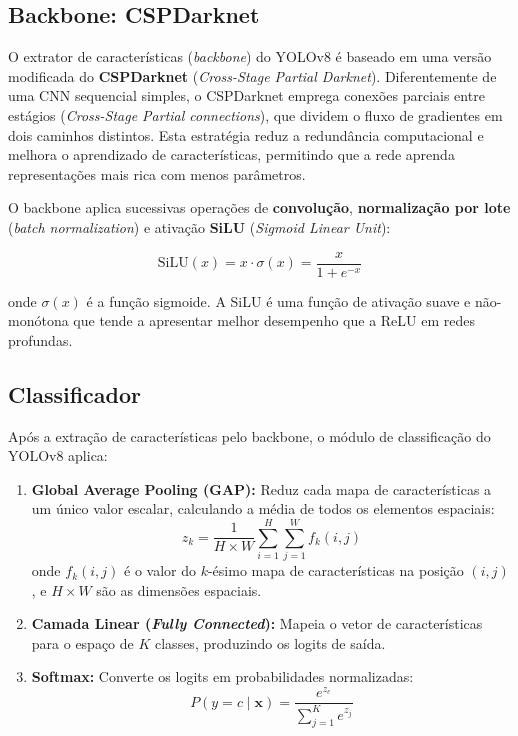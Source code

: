 \documentclass[12pt, a4paper]{article}
\begin{document}
\subsection{Backbone: CSPDarknet}

O extrator de características (\textit{backbone}) do YOLOv8 é baseado em uma versão modificada do \textbf{CSPDarknet} (\textit{Cross-Stage Partial Darknet}). Diferentemente de uma CNN sequencial simples, o CSPDarknet emprega conexões parciais entre estágios (\textit{Cross-Stage Partial connections}), que dividem o fluxo de gradientes em dois caminhos distintos. Esta estratégia reduz a redundância computacional e melhora o aprendizado de características, permitindo que a rede aprenda representações mais rica com menos parâmetros.

O backbone aplica sucessivas operações de \textbf{convolução}, \textbf{normalização por lote} (\textit{batch normalization}) e ativação \textbf{SiLU} (\textit{Sigmoid Linear Unit}):

\begin{equation}
    \text{SiLU}(x) = x \cdot \sigma(x) = \frac{x}{1 + e^{-x}}
\end{equation}

onde $\sigma(x)$ é a função sigmoide. A SiLU é uma função de ativação suave e não-monótona que tende a apresentar melhor desempenho que a ReLU em redes profundas.

\subsection{Classificador}

Após a extração de características pelo backbone, o módulo de classificação do YOLOv8 aplica:

\begin{enumerate}
    \item \textbf{Global Average Pooling (GAP):} Reduz cada mapa de características a um único valor escalar, calculando a média de todos os elementos espaciais:
    \begin{equation}
        z_k = \frac{1}{H \times W} \sum_{i=1}^{H} \sum_{j=1}^{W} f_k(i, j)
    \end{equation}
    onde $f_k(i,j)$ é o valor do $k$-ésimo mapa de características na posição $(i,j)$, e $H \times W$ são as dimensões espaciais.

    \item \textbf{Camada Linear (\textit{Fully Connected}):} Mapeia o vetor de características para o espaço de $K$ classes, produzindo os logits de saída.

    \item \textbf{Softmax:} Converte os logits em probabilidades normalizadas:
    \begin{equation}
        P(y = c \mid \mathbf{x}) = \frac{e^{z_c}}{\sum_{j=1}^{K} e^{z_j}}
    \end{equation}
\end{enumerate}
\end{document}
